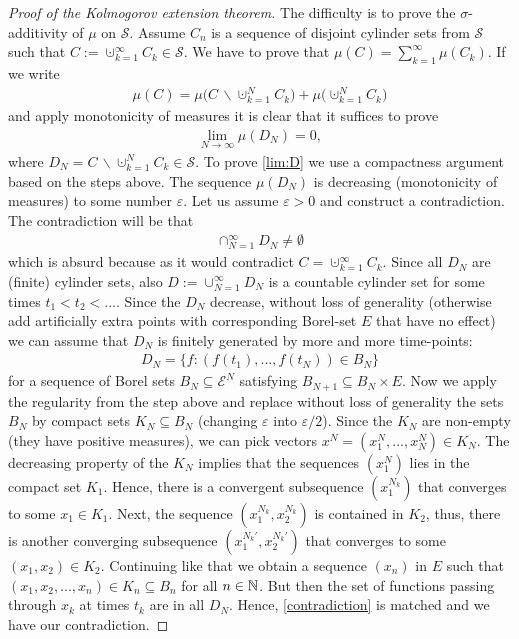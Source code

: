 \begin{proof}[Proof of the Kolmogorov extension theorem]
		\smallskip The difficulty is to prove the $\sigma$-additivity of $\mu$ on $\mathcal S$. Assume $C_n$ is a sequence of disjoint cylinder sets from $\mathcal S$ such that $C:=\cupdot_{k=1}^\infty C_k\in \mathcal S$. We have to prove that $\mu(C)=\sum_{k=1}^\infty \mu(C_k)$. If we write 
\begin{align*}
	\mu(C)=\mu\big(C\,\backslash \cupdot_{k=1}^N C_k\big)+\mu\big(\cupdot_{k=1}^N C_k\big)
\end{align*}
and apply monotonicity of measures it is clear that it suffices to prove 
\begin{align}\label{lim:D}
	\lim_{N\to\infty}\mu(D_N)=0,
\end{align}
where $D_N=C\,\backslash \cupdot_{k=1}^N C_k\in \mathcal S$. To prove \eqref{lim:D} we use a compactness argument based on the steps above. The sequence $\mu(D_N)$ is decreasing (monotonicity of measures) to some number $\varepsilon$. Let us assume $\varepsilon>0$ and construct a contradiction. The contradiction will be that 
\begin{align}\label{contradiction}
	\cap_{N=1}^\infty D_N\neq \emptyset
\end{align}
which is absurd because as it would contradict $C=\cupdot_{k=1}^\infty C_k$. Since all $D_N$ are (finite) cylinder sets, also $D:=\cup_{N=1}^\infty D_N$ is a countable cylinder set for some times $t_1<t_2<...$. Since the $D_N$ decrease, without loss of generality (otherwise add artificially extra points with corresponding Borel-set $E$ that have no effect) we can assume that $D_N$ is finitely generated by more and more time-points:
\begin{align*}
	D_N=\{f: (f(t_1),..., f(t_N))\in B_N\}
\end{align*}
for a sequence of Borel sets $B_N\subseteq \mathcal E^N$ satisfying $B_{N+1}\subseteq B_{N}\times E$. Now we apply the regularity from the step above and replace without loss of generality the sets $B_N$ by compact sets $K_N\subseteq B_N$ (changing $\varepsilon$ into $\varepsilon/2$). Since the $K_N$ are non-empty (they have positive measures), we can pick vectors $x^N=(x_1^N,...,x_N^N)\in K_N$. The decreasing property of the $K_N$ implies that the sequences $(x_1^N)$ lies in the compact set $K_1$. Hence, there is a convergent subsequence $(x_1^{N_k})$ that converges to some $x_1\in K_1$. Next, the sequence $(x_1^{N_k}, x_2^{N_k})$ is contained in $K_2$, thus, there is another converging subsequence $(x_1^{N_k'}, x_2^{N_k'})$ that converges to some $(x_1,x_2)\in K_2$. Continuing like that we obtain a sequence $(x_n)$ in $E$ such that $(x_1,x_2,...,x_n)\in K_n\subseteq B_n$ for all $n\in\mathbb{N}$. But then the set of functions passing through $x_k$ at times $t_k$ are in all $D_N$. Hence, \eqref{contradiction} is matched and we have our contradiction.
\end{proof}



